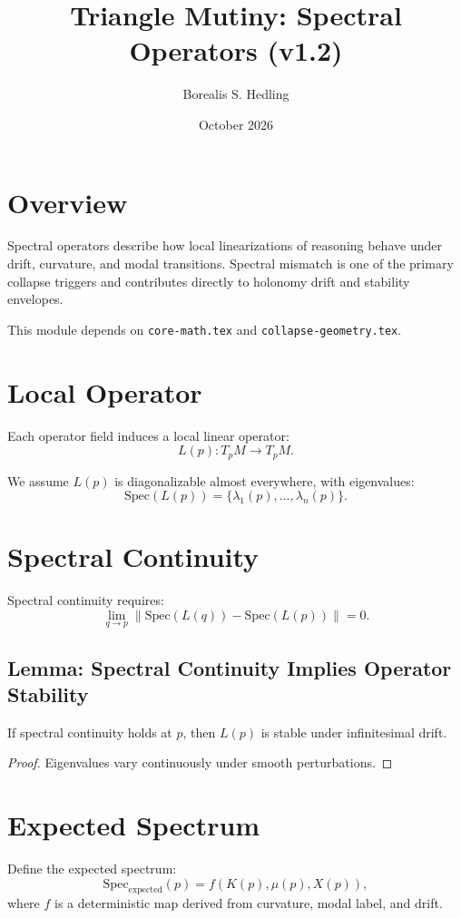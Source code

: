\documentclass[11pt]{article}
\title{Triangle Mutiny: Spectral Operators (v1.2)}
\author{Borealis S. Hedling}
\date{October 2026}
\begin{document}
\maketitle

\section{Overview}

Spectral operators describe how local linearizations of reasoning behave
under drift, curvature, and modal transitions. Spectral mismatch is one of
the primary collapse triggers and contributes directly to holonomy drift
and stability envelopes.

This module depends on \texttt{core-math.tex} and \texttt{collapse-geometry.tex}.

\section{Local Operator}

Each operator field induces a local linear operator:
\[
L(p) : T_pM \to T_pM.
\]

We assume $L(p)$ is diagonalizable almost everywhere, with eigenvalues:
\[
\mathrm{Spec}(L(p)) = \{\lambda_1(p), \ldots, \lambda_n(p)\}.
\]

\section{Spectral Continuity}

Spectral continuity requires:
\[
\lim_{q \to p}
  \|\mathrm{Spec}(L(q)) - \mathrm{Spec}(L(p))\| = 0.
\]

\subsection{Lemma: Spectral Continuity Implies Operator Stability}
If spectral continuity holds at $p$, then $L(p)$ is stable under infinitesimal
drift.

\begin{proof}
Eigenvalues vary continuously under smooth perturbations.
\end{proof}

\section{Expected Spectrum}

Define the expected spectrum:
\[
\mathrm{Spec}_{\mathrm{expected}}(p)
  = f(K(p), \mu(p), X(p)),
\]
where $f$ is a deterministic map derived from curvature, modal label, and drift.
\end{document}
